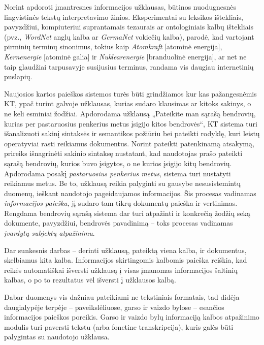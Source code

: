 \begin{multicols}{2}
 Norint apdoroti įmantresnes informacijos užklausas, būtinos nuodugnesnės lingvistinės tekstų interpretavimo žinios. Eksperimentai su leksikos ištekliais, pavyzdžiui, kompiuteriui suprantamais tezaurais ar ontologiniais kalbų ištekliais (pvz., \textit{WordNet} anglų kalba ar \textit{GermaNet} vokiečių kalba), parodė, kad vartojant pirminių terminų sinonimus, tokius kaip \textit{Atomkraft} [atominė energija], \textit{Kernenergie} [atominė galia] ir \textit{Nuklearenergie} [branduolinė energija], ar net ne taip glaudžiai tarpusavyje susijusius terminus, randama vis daugiau internetinių puslapių. 

Naujosios kartos paieškos sistemos turės būti grindžiamos kur kas pažangesnėmis KT, ypač turint galvoje užklausas, kurias sudaro klausimas ar kitoks sakinys, o ne keli esminiai žodžiai. Apdorodama užklausą „Pateikite man sąrašą bendrovių, kurias per pastaruosius penkerius metus įsigijo kitos bendrovės“, KT sistema turi išanalizuoti sakinį sintaksės ir semantikos požiūriu bei pateikti rodyklę, kuri leistų operatyviai rasti reikiamus dokumentus. Norint pateikti patenkinamą atsakymą, prireiks išnagrinėti sakinio sintaksę nustatant, kad naudotojas prašo pateikti sąrašą bendrovių, kurios buvo įsigytos, o ne kurios įsigijo kitų bendrovių. Apdorodama posakį \textit{pastaruosius penkerius metus}, sistema turi nustatyti reikiamus metus. Be to, užklausą reikia palyginti su gausybe nesusistemintų duomenų, ieškant naudotojo pageidaujamos informacijos. Šis procesas vadinamas \textit{informacijos paieška}, jį sudaro tam tikrų dokumentų paieška ir vertinimas. Rengdama bendrovių sąrašą sistema dar turi atpažinti ir konkrečią žodžių seką dokumente, pavyzdžiui, bendrovės pavadinimą – toks procesas vadinamas \textit{įvardytų subjektų atpažinimu}.  


Dar sunkesnis darbas – derinti užklausą, pateiktą viena kalba, ir dokumentus, skelbiamus kita kalba. Informacijos skirtingomis kalbomis paieška reiškia, kad reikės automatiškai išversti užklausą į visas įmanomas informacijos šaltinių kalbas, o po to rezultatus vėl išversti į užklausos kalbą.   

    Dabar duomenys vis dažniau pateikiami ne tekstiniais formatais, tad didėja daugialypėje terpėje – paveikslėliuose, garso ir vaizdo bylose – esančios informacijos paieškos poreikis. Garso ir vaizdo bylų informaciją kalbos atpažinimo modulis turi paversti tekstu (arba fonetine transkripcija), kuris galės būti palygintas su naudotojo užklausa.   


\end{multicols}
